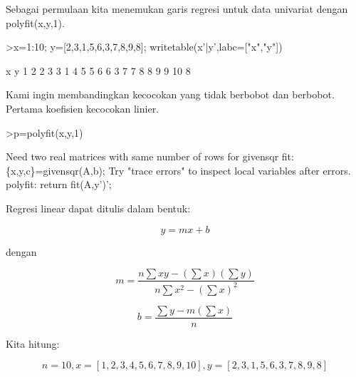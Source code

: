 \documentclass[a4paper,10pt]{article}
\begin{document}
\begin{eulernotebook}
\begin{eulercomment}
\begin{eulercomment}
\begin{eulercomment}
Sebagai permulaan kita menemukan garis regresi untuk data univariat
dengan polyfit(x,y,1).
\end{eulercomment}
\begin{eulerprompt}
>x=1:10; y=[2,3,1,5,6,3,7,8,9,8]; writetable(x'|y',labc=["x","y"])
\end{eulerprompt}
\begin{euleroutput}
           x         y
           1         2
           2         3
           3         1
           4         5
           5         6
           6         3
           7         7
           8         8
           9         9
          10         8
\end{euleroutput}
\begin{eulercomment}
Kami ingin membandingkan kecocokan yang tidak berbobot dan berbobot.
Pertama koefisien kecocokan linier.
\end{eulercomment}
\begin{eulerprompt}
>p=polyfit(x,y,1)
\end{eulerprompt}
\begin{euleroutput}
  Need two real matrices with same number of rows for givensqr
  fit:
      \{x,y,c\}=givensqr(A,b);
  Try "trace errors" to inspect local variables after errors.
  polyfit:
      return fit(A,y')';
\end{euleroutput}
\begin{eulercomment}
Regresi linear dapat ditulis dalam bentuk:\\
\end{eulercomment}
\begin{eulerformula}
\[
y=mx + b
\]
\end{eulerformula}
\begin{eulercomment}
dengan\\
\end{eulercomment}
\begin{eulerformula}
\[
m = \frac{n \sum xy - (\sum x)(\sum y)}{n \sum x^2 - (\sum x)^2}
\]
\end{eulerformula}
\begin{eulerformula}
\[
b = \frac{\sum y - m (\sum x)}{n}
\]
\end{eulerformula}
\begin{eulercomment}
Kita hitung:\\
\end{eulercomment}
\begin{eulerformula}
\[
n = 10, x=[1,2,3,4,5,6,7,8,9,10], y=[2,3,1,5,6,3,7,8,9,8]
\]
\end{eulerformula}

\end{eulercomment}
\end{eulercomment}
\end{eulernotebook}
\end{document}
